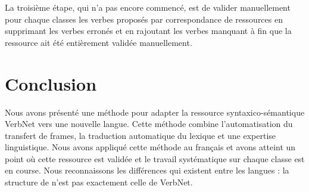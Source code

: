 La troisième étape, qui n'a pas encore commencé, est de valider manuellement
pour chaque classes les verbes proposés par correspondance de ressources en
supprimant les verbes erronés et en rajoutant les verbes manquant à fin que la
ressource ait été entièrement validée manuellement.

\section{Conclusion}

Nous avons présenté une méthode pour adapter la ressource syntaxico-sémantique
VerbNet vers une nouvelle langue. Cette méthode combine l'automatisation du
transfert de frames, la traduction automatique du lexique et une expertise
linguistique. Nous avons appliqué cette méthode au français et avons atteint un
point où cette ressource est validée et le travail systématique sur chaque
classe est en course. Nous reconnaissons les différences qui existent entre
les langues : la structure de \verbenet{} n'est pas exactement celle de
VerbNet.

